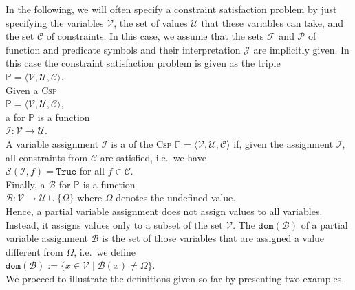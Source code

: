 In the following, we will often specify a constraint satisfaction problem by just specifying the variables
$\mathcal{V}$,  the set of values $\mathcal{U}$ that these variables can take, and the set $\mathcal{C}$ of
constraints.  In this case, we assume that the sets $\mathcal{F}$ and $\mathcal{P}$ of function and predicate
symbols and their interpretation $\mathcal{J}$ are implicitly given.  In this case the constraint satisfaction
problem is given as the triple 
\\[0.2cm]
\hspace*{1.3cm}
$\mathbb{P} = \langle \mathcal{V}, \mathcal{U}, \mathcal{C} \rangle$.
\\[0.2cm]
Given a \textsc{Csp}
\\[0.2cm]
\hspace*{1.3cm}
 $\mathbb{P} = \langle \mathcal{V}, \mathcal{U}, \mathcal{C} \rangle$, 
\\[0.2cm]
a  for $\mathbb{P}$ is a function
\\[0.2cm]
\hspace*{1.3cm}
$\mathcal{I}: \mathcal{V} \rightarrow \mathcal{U}$.
\\[0.2cm]
A variable assignment $\mathcal{I}$ is a  of the \textsc{Csp}
$\mathbb{P}= \langle \mathcal{V}, \mathcal{U}, \mathcal{C} \rangle$ 
if, given the assignment $\mathcal{I}$, all constraints from $\mathcal{C}$ are satisfied, i.e.~we have
\\[0.2cm]
\hspace*{1.3cm}
$\mathcal{S}(\mathcal{I}, f) = \mathtt{True}$ \quad for all $f \in \mathcal{C}$.
\\[0.2cm]
Finally, a   $\mathcal{B}$ for $\mathbb{P}$ is a function
\\[0.2cm]
\hspace*{1.3cm}
$\mathcal{B}: \mathcal{V} \rightarrow \mathcal{U} \cup \{ \Omega \}$ \quad where $\Omega$ denotes the undefined value.
\\[0.2cm]
Hence, a partial variable assignment does not assign values to all variables.  Instead, it assigns values only
to a subset of the set $\mathcal{V}$.  The  $\mathtt{dom}(\mathcal{B})$  of a partial variable assignment $\mathcal{B}$ is the
set of those variables that are assigned a value different from $\Omega$, i.e.~we define
\\[0.2cm]
\hspace*{1.3cm}
$\mathtt{dom}(\mathcal{B}) := \bigl\{ x \in \mathcal{V} \mid \mathcal{B}(x) \not= \Omega \bigr\}$.
\\[0.2cm]
We proceed to illustrate the definitions given so far by presenting two examples.


